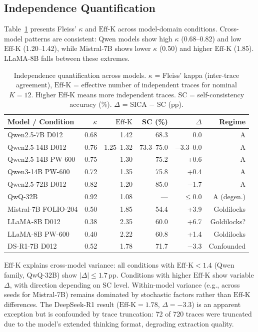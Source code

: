 \documentclass[11pt,a4paper]{article}
\newcommand{\effk}{\text{Eff-K}}
\begin{document}
\subsection{Independence Quantification}
\label{sec:independence}

Table~\ref{tab:independence} presents Fleiss' $\kappa$ and $\effk$ across model-domain conditions. Cross-model patterns are consistent: Qwen models show high $\kappa$ (0.68--0.82) and low $\effk$ (1.20--1.42), while Mistral-7B shows lower $\kappa$ (0.50) and higher $\effk$ (1.85). LLaMA-8B falls between these extremes.

\begin{table}[t]
\centering
\caption{Independence quantification across models. $\kappa$ = Fleiss' kappa (inter-trace agreement), $\effk$ = effective number of independent traces for nominal $K=12$. Higher $\effk$ means more independent traces. SC = self-consistency accuracy (\%). $\Delta$ = SICA $-$ SC (pp).}
\label{tab:independence}
\small
\begin{tabular}{lrrrrr}
\toprule
\textbf{Model / Condition} & \textbf{$\kappa$} & \textbf{$\effk$} & \textbf{SC (\%)} & \textbf{$\Delta$} & \textbf{Regime} \\
\midrule
Qwen2.5-7B D012     & 0.68 & 1.42 & 68.3 & 0.0  & A \\
Qwen2.5-14B D012    & 0.76 & 1.25--1.32 & 73.3--75.0 & $-$3.3--0.0 & A \\
Qwen2.5-14B PW-600  & 0.75 & 1.30 & 75.2 & +0.6 & A \\
Qwen3-14B PW-600    & 0.72 & 1.35 & 75.8 & +0.4 & A \\
Qwen2.5-72B D012    & 0.82 & 1.20 & 85.0 & $-$1.7 & A \\
QwQ-32B             & 0.92 & 1.08 & --- & $\leq$0.0 & A (degen.) \\
\midrule
Mistral-7B FOLIO-204 & 0.50 & 1.85 & 54.4 & +3.9 & Goldilocks \\
LLaMA-8B D012       & 0.38 & 2.35 & 60.0 & +6.7 & Goldilocks? \\
LLaMA-8B PW-600     & 0.40 & 2.22 & 60.8 & +1.4 & Goldilocks \\
DS-R1-7B D012       & 0.52 & 1.78 & 71.7 & $-$3.3 & Confounded \\
\bottomrule
\end{tabular}
\end{table}

$\effk$ explains cross-model variance: all conditions with $\effk < 1.4$ (Qwen family, QwQ-32B) show $|\Delta| \leq 1.7$\,pp. Conditions with higher $\effk$ show variable $\Delta$, with direction depending on SC level. Within-model variance (e.g., across seeds for Mistral-7B) remains dominated by stochastic factors rather than $\effk$ differences. The DeepSeek-R1 result ($\effk = 1.78$, $\Delta = -3.3$) is an apparent exception but is confounded by trace truncation: 72 of 720 traces were truncated due to the model's extended thinking format, degrading extraction quality.
\end{document}
